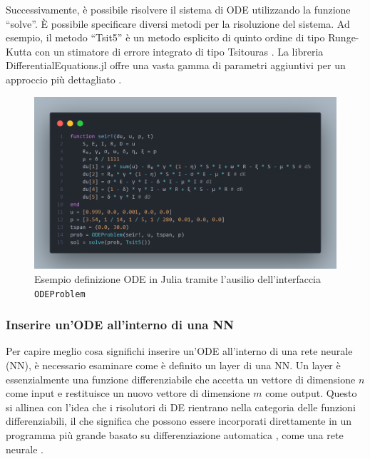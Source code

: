 Successivamente, è possibile risolvere il sistema di ODE utilizzando la 
funzione ``solve''. È possibile specificare diversi metodi per la 
risoluzione del sistema. Ad esempio, il metodo ``Tsit5'' è un metodo 
esplicito di quinto ordine di tipo Runge-Kutta con un stimatore di 
errore integrato di tipo Tsitouras \cite{10.1016/j.camwa.2011.06.002}. 
La libreria DifferentialEquations.jl offre una vasta gamma di parametri 
aggiuntivi per un approccio più dettagliato \cite{rackauckas2017differentialequations}.

\begin{figure}[H]
    \begin{center}
        \includegraphics[width=\textwidth]{img/fdefinition.png}
        \caption{Esempio definizione ODE in Julia tramite l'ausilio dell'interfaccia \texttt{ODEProblem}}
        \label{fig:ODE_Julia_example}
    \end{center}
\end{figure}

\subsubsection{Inserire un'ODE all'interno di una NN}

Per capire meglio cosa significhi inserire un'ODE all'interno di una 
rete neurale (NN), è necessario esaminare come è definito un layer di 
una NN. Un layer è essenzialmente una funzione differenziabile che 
accetta un vettore di dimensione $n$ come input e restituisce un nuovo 
vettore di dimensione $m$ come output. Questo si allinea con l'idea che 
i risolutori di DE rientrano nella categoria delle funzioni 
differenziabili, il che significa che possono essere incorporati 
direttamente in un programma più grande basato su differenziazione 
automatica \cite{BARTHOLOMEWBIGGS2000171}, come una rete neurale \cite{innes2018fashionable} \cite{pal2023lux}. 

